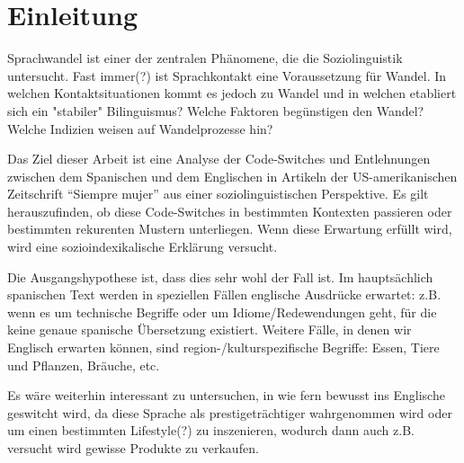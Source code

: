 \section{Einleitung}

\begin{comment}
* ca 3/4 Seiten
* Untersuchungsgegenstand
* Erkenntnisinteresse
* Forschungsstand
* Vorgehensweise: also Section 2 macht blabla, Section 3 blablup, ....
* Ergebnisse können/sollen angedeuten werden
\end{comment}



Sprachwandel ist einer der zentralen Phänomene, die die Soziolinguistik untersucht.
Fast immer(?) ist Sprachkontakt eine Voraussetzung für Wandel.
In welchen Kontaktsituationen kommt es jedoch zu Wandel und in welchen etabliert sich ein "stabiler" Bilinguismus?
Welche Faktoren begünstigen den Wandel?
Welche Indizien weisen auf Wandelprozesse hin?


Das Ziel dieser Arbeit ist eine Analyse der Code-Switches und Entlehnungen zwischen dem Spanischen und dem Englischen in Artikeln der US-amerikanischen Zeitschrift ``Siempre mujer'' aus einer soziolinguistischen Perspektive.
Es gilt herauszufinden, ob diese Code-Switches in bestimmten Kontexten passieren oder bestimmten rekurenten Mustern unterliegen.
Wenn diese Erwartung erfüllt wird, wird eine sozioindexikalische Erklärung versucht.

Die Ausgangshypothese ist, dass dies sehr wohl der Fall ist.
Im hauptsächlich spanischen Text werden in speziellen Fällen englische Ausdrücke erwartet:
z.B. wenn es um technische Begriffe oder um Idiome/Redewendungen geht, für die keine genaue spanische Übersetzung existiert.
Weitere Fälle, in denen wir Englisch erwarten können, sind region-/kulturspezifische Begriffe: Essen, Tiere und Pflanzen, Bräuche, etc.

Es wäre weiterhin interessant zu untersuchen, in wie fern bewusst ins Englische geswitcht wird, da diese Sprache als prestigeträchtiger wahrgenommen wird oder um einen bestimmten Lifestyle(?) zu inszenieren, wodurch dann auch z.B. versucht wird gewisse Produkte zu verkaufen.


